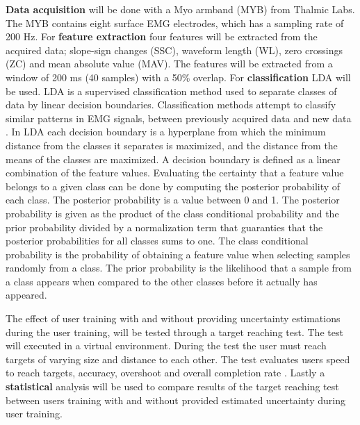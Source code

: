 

\textbf{Data acquisition} will be done with a Myo armband (MYB) from Thalmic Labs. The MYB contains eight surface EMG electrodes, which has a sampling rate of 200 Hz.
For \textbf{feature extraction} four features will be extracted from the acquired data; slope-sign changes (SSC), waveform length (WL), zero crossings (ZC) and mean absolute value (MAV). The features will be extracted from a window of 200 ms (40 samples) with a 50\% overlap.
For \textbf{classification} LDA will be used. LDA is a supervised classification method used to separate classes of data by linear decision boundaries. Classification methods attempt to classify similar patterns in EMG signals, between previously acquired data and new data \cite{Mendez2017}. In LDA each decision boundary is a hyperplane from which the minimum distance from the classes it separates is maximized, and the distance from the means of the classes are maximized. A decision boundary is defined as a linear combination of the feature values.
Evaluating the certainty that a feature value belongs to a given class can be done by computing the posterior probability of each class. The posterior probability is a value between 0 and 1. The posterior probability is given as the product of the class conditional probability and the prior probability divided by a normalization term that guaranties that the posterior probabilities for all classes sums to one. The class conditional probability is the probability of obtaining a feature value when selecting samples randomly from a class. The prior probability is the likelihood that a sample from a class appears when compared to the other classes before it actually has appeared.

The effect of user training with and without providing uncertainty estimations during the user training, will be tested through a target reaching test. The test will executed in a virtual environment. During the test the user must reach targets of varying size and distance to each other. The test evaluates users speed to reach targets, accuracy, overshoot and overall completion rate \cite{Scheme2013}. 
Lastly a \textbf{statistical} analysis will be used to compare results of the target reaching test between users training with and without provided estimated uncertainty during user training.


